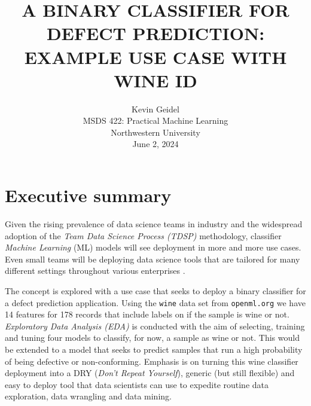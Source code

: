 \documentclass[11pt,letterpaper]{article}
\begin{document}
\selectfont
{}
\doublespacing
\setlength{\droptitle}{1in} 

\title{\large{A BINARY CLASSIFIER FOR DEFECT PREDICTION: \\ EXAMPLE USE CASE WITH WINE ID \\\vspace{1.2in}}}

\author{
Kevin Geidel \\
MSDS 422: Practical Machine Learning \\
Northwestern University \\
June 2, 2024 \\
}

\date{}
\maketitle
\thispagestyle{empty}	
\clearpage
\setcounter{page}{1}

\section{Executive summary}
\tab 

Given the rising prevalence of data science teams in industry and the widespread adoption of the \emph{Team Data Science Process (TDSP)} methodology, classifier \emph{Machine Learning} (ML) models will see deployment in more and more use cases. Even small teams will be deploying data science tools that are tailored for many different settings throughout various enterprises \citep{Hyatt:2024}.

The concept is explored with a use case that seeks to deploy a binary classifier for a defect prediction application. Using the \texttt{wine} data set \citep{Vanschoren:2014} from \texttt{openml.org} we have 14 features for 178 records that include labels on if the sample is wine or not. \emph{Exploratory Data Analysis (EDA)} is conducted with the aim of selecting, training and tuning four models to classify, for now, a sample as wine or not. This would be extended to a model that seeks to predict samples that run a high probability of being defective or non-conforming. Emphasis is on turning this wine classifier deployment into a DRY (\emph{Don't Repeat Yourself}), generic (but still flexible) and easy to deploy tool that data scientists can use to expedite routine data exploration, data wrangling and data mining. 
\end{document}
